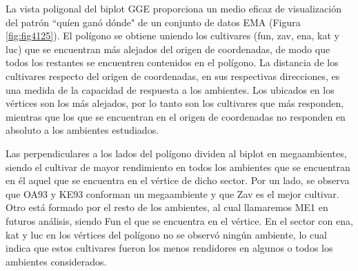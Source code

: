 

La vista poligonal del biplot GGE proporciona un medio eficaz de visualización del patrón ``quíen ganó dónde" de un conjunto de datos EMA (Figura \ref{fig:fig4125}). El polígono se obtiene uniendo los cultivares (fun, zav, ena, kat y luc) que se encuentran más alejados del origen de coordenadas, de modo que todos los restantes se encuentren contenidos en el polígono. La distancia de los cultivares respecto del origen de coordenadas, en sus respectivas direcciones, es una medida de la capacidad de respuesta a los ambientes. Los ubicados en los vértices son los más alejados, por lo tanto son los cultivares que más responden, mientras que los que se encuentran en el origen de coordenadas no responden en absoluto a los ambientes estudiados.

Las perpendiculares a los lados del polígono dividen al biplot en megaambientes, siendo el cultivar de mayor rendimiento en todos los ambientes que se encuentran en él aquel que se encuentra en el vértice de dicho sector. Por un lado, se observa que OA93 y KE93 conforman un megaambiente y que Zav es el mejor cultivar. Otro está formado por el resto de los ambientes, al cual llamaremos ME1 en futuros análisis, siendo Fun el que se encuentra en el vértice. En el sector con ena, kat y luc en los vértices del polígono no se observó ningún ambiente, lo cual indica que estos cultivares fueron los menos rendidores en algunos o todos los ambientes considerados.

